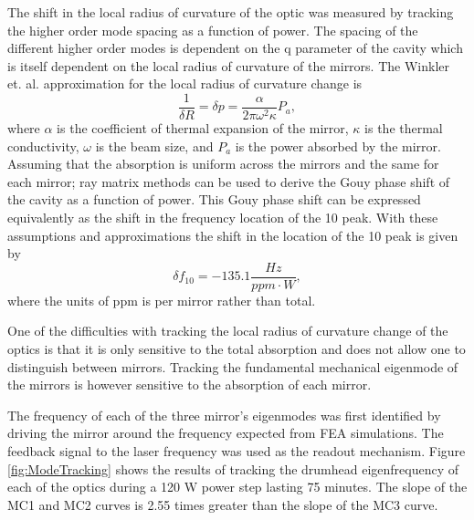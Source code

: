 \documentclass[10pt]{article}
\begin{document}
The shift in the local radius of curvature of the optic was measured by 
tracking the higher order mode spacing as a function of power.  
The spacing of the different higher order modes is dependent on the q 
parameter of the cavity which is itself dependent on the local radius of 
curvature of the mirrors.  
The Winkler et. al.\cite{Winkler1991} approximation for the local radius of 
curvature change is
\begin{equation}
	\frac{1}{\delta R}=\delta p=\frac{\alpha}{2\pi\omega^2\kappa}P_a,
\end{equation}
where $\alpha$ is the coefficient of thermal expansion of the mirror,  
$\kappa$ is the thermal conductivity, $\omega$ is the beam size, and 
$P_a$ is the power absorbed by the mirror.  
Assuming that the absorption is uniform across the mirrors and the same for 
each mirror; ray matrix methods can be used to derive the Gouy phase shift 
of the cavity as a function of power.  
This Gouy phase shift can be expressed equivalently as the shift in the 
frequency location of the 10 peak.  
With these assumptions and approximations the shift in the location of the 10 
peak is given by 
\begin{equation}
	\delta f_{10}=-135.1 \frac{Hz}{ppm\cdot W},
\end{equation}
where the units of ppm is per mirror rather than total.

One of the difficulties with tracking the local radius of curvature change of 
the optics is that it is only sensitive to the total absorption and does not 
allow one to distinguish between mirrors.  
Tracking the fundamental mechanical eigenmode of the mirrors is however sensitive 
to the absorption of each mirror.  

The frequency of each of the three mirror's eigenmodes was first identified by 
driving the mirror around the frequency expected from FEA simulations.  
The feedback signal to the laser frequency was used as the readout mechanism.  
Figure \ref{fig:ModeTracking} shows the results of tracking the drumhead eigenfrequency 
of each of the optics during a 120 W power step lasting 75 minutes.  
The slope of the MC1 and MC2 curves is 2.55 times greater than the slope of the 
MC3 curve.  
\end{document}
